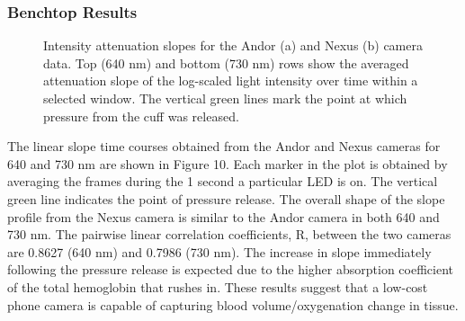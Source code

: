         \subsubsection{Benchtop Results}
        \begin{figure}
            \begin{center}
            \end{center}
            \caption{Intensity attenuation slopes for the Andor (a) and Nexus (b) camera data. Top (640 nm) and bottom (730 nm) rows show the averaged attenuation slope of the log-scaled light intensity over time within a selected window. The vertical green lines mark the point at which pressure from the cuff was released.} 
            \label{fig:D2results}
        \end{figure} 
        The linear slope time courses obtained from the Andor and Nexus cameras for 640 and 730 nm are shown in Figure 10. Each marker in the plot is obtained by averaging the frames during the 1 second a particular LED is on. The vertical green line indicates the point of pressure release. The overall shape of the slope profile from the Nexus camera is similar to the Andor camera in both 640 and 730 nm. The pairwise linear correlation coefficients, R, between the two cameras are 0.8627 (640 nm) and 0.7986 (730 nm). The increase in slope immediately following the pressure release is expected due to the higher absorption coefficient of the total hemoglobin that rushes in. These results suggest that a low-cost phone camera is capable of capturing blood volume/oxygenation change in tissue. 



